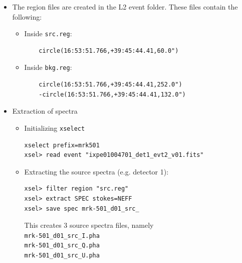 \begin{itemize}
\begin{itemize}
            \item Creation of a source region:\\
            In the menu: e.g. \verb|Region| $\rightarrow$ \verb|Shape| $\rightarrow$ \verb|Circle|\\
            \verb|edit| $\rightarrow$ \verb|region| $\rightarrow$ click + drag to draw the region\\
            Double-click on region to open the region dialog. Center in \verb|fk5|, radius in \verb|arcsec|.

            \item Creation of a background region:\\
            In the menu: e.g. \verb|Region| $\rightarrow$ \verb|Shape| $\rightarrow$ \verb|Annulus|\\
            \verb|edit| $\rightarrow$ \verb|region| $\rightarrow$ click + drag to draw the region\\
            Double-click on region to open the region dialog. Center in \verb|fk5|, radius in \verb|arcsec|.
        \end{itemize}

        \item The region files are created in the L2 event folder. These files contain the following:
        \begin{itemize}
            \item Inside \verb|src.reg|:
            \begin{verbatim}
    circle(16:53:51.766,+39:45:44.41,60.0")
            \end{verbatim}

            \item Inside \verb|bkg.reg|:
            \begin{verbatim}
    circle(16:53:51.766,+39:45:44.41,252.0")
    -circle(16:53:51.766,+39:45:44.41,132.0")
            \end{verbatim}
        \end{itemize}

        \item Extraction of spectra
        \begin{itemize}
            \item Initializing \verb|xselect|
            \begin{verbatim}
xselect prefix=mrk501
xsel> read event "ixpe01004701_det1_evt2_v01.fits"
            \end{verbatim}
            
            \item Extracting the source spectra (e.g. detector 1):
            \begin{verbatim}
xsel> filter region "src.reg"
xsel> extract SPEC stokes=NEFF
xsel> save spec mrk-501_d01_src_
            \end{verbatim}
            This creates 3 source spectra files, namely\\
            \verb|mrk-501_d01_src_I.pha|\\
            \verb|mrk-501_d01_src_Q.pha|\\
            \verb|mrk-501_d01_src_U.pha|


\end{itemize}
\end{itemize}
